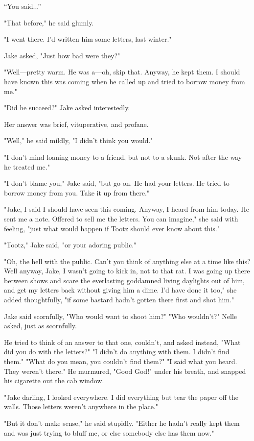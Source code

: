 \documentclass{novel}
\begin{document}
“You said...”

"That before," he said glumly.

"I went there. I'd written him some letters, last winter."

Jake asked, "Just how bad were they?"

"Well—pretty warm. He was a—oh, skip that. Anyway, he kept them. I should have known this was coming when he called up and tried to borrow money from me."

"Did he succeed?" Jake asked interestedly.

Her answer was brief, vituperative, and profane.

"Well," he said mildly, "I didn't think you would."

"I don't mind loaning money to a friend, but not to a skunk. Not after the way he treated me."

"I don't blame you," Jake said, "but go on. He had your letters. He tried to borrow money from you. Take it up from there."

"Jake, I said I should have seen this coming. Anyway, I heard from him today. He sent me a note. Offered to sell me the letters. You can imagine," she said with feeling, "just what would happen if Tootz should ever know about this."

"Tootz," Jake said, "or your adoring public."

"Oh, the hell with the public. Can't you think of anything else at a time like this? Well anyway, Jake, I wasn't going to kick in, not to that rat. I was going up there between shows and scare the everlasting goddamned living daylights out of him, and get my letters back without giving him a dime. I'd have done it too," she added thoughtfully, "if some bastard hadn't gotten there first and shot him."

Jake said scornfully, "Who would want to shoot him?" "Who wouldn't?" Nelle asked, just as scornfully.

He tried to think of an answer to that one, couldn't, and asked instead, "What did you do with the letters?" "I didn't do anything with them. I didn't find them." "What do you mean, you couldn't find them?" "I said what you heard. They weren't there." He murmured, "Good God!" under his breath, and snapped his cigarette out the cab window.

"Jake darling, I looked everywhere. I did everything but tear the paper off the walls. Those letters weren't anywhere in the place."

"But it don't make sense," he said stupidly. "Either he hadn't really kept them and was just trying to bluff me, or else somebody else has them now."
\end{document}
